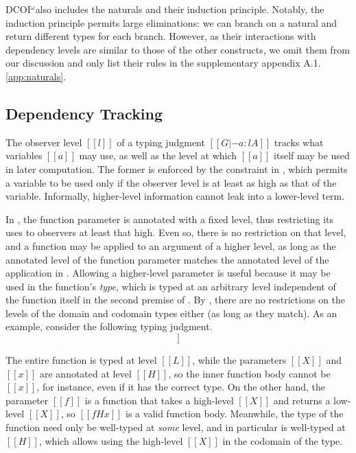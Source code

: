 \documentclass[acmsmall]{acmart}
\makeatletter
\theoremstyle{linked}
\theoremstyle{deflinked}
\theoremstyle{acmdefinition}
\newcommand{\name}{\texorpdfstring{DCOI$^{\omega}$\@\xspace}{DCOI-omega}}
\makeatother
\begin{document}
\name also includes the naturals and their induction principle.  Notably, the
induction principle permits large eliminations: we can branch on a natural and
return different types for each branch.  However, as their interactions with
dependency levels are similar to those of the other constructs, we omit them
from our discussion and only list their rules in
\ifpublic the supplementary appendix A.1.
\else \cref{app:naturals}.
\fi

\subsection{Dependency Tracking} \label{sec:dep}

The observer level $[[l]]$ of a typing judgment $[[G |- a : l A]]$
tracks what variables $[[a]]$ may use, as well as the level at which $[[a]]$ itself may be used in later computation.
The former is enforced by the constraint in ,
which permits a variable to be used only if the observer level is at least as high as that of the variable.
Informally, higher-level information cannot leak into a lower-level term.

In , the function parameter is annotated with a fixed level,
thus restricting its uses to observers at least that high.
Even so, there is no restriction on that level,
and a function may be applied to an argument of a higher level,
as long as the annotated level of the function parameter
matches the annotated level of the application in .
Allowing a higher-level parameter is useful because it may be used in the function's \emph{type},
which is typed at an arbitrary level independent of the function itself
in the second premise of .
By , there are no restrictions on the levels of the domain and codomain types either
(as long as they match).
As an example, consider the following typing judgment.
%
{
\setlength{\abovedisplayskip}{0pt}
\setlength{\belowdisplayskip}{0pt}
\begin{displaymath}
  [[:concrete: nil |- (\ H X . \ H x . \ L f . f H x) : L (Pi X : H Univ i . H X -> L (H X -> X) -> X)]]
\end{displaymath}
}

The entire function is typed at level $[[L]]$,
while the parameters $[[X]]$ and $[[x]]$ are annotated at level $[[H]]$,
so the inner function body cannot be $[[x]]$,
for instance, even if it has the correct type.
On the other hand, the parameter $[[f]]$ is a function that takes a high-level $[[X]]$
and returns a low-level $[[X]]$, so $[[f H x]]$ is a valid function body.
Meanwhile, the type of the function need only be well-typed at \emph{some} level,
and in particular is well-typed at $[[H]]$,
which allows using the high-level $[[X]]$
in the codomain of the type.
\end{document}
